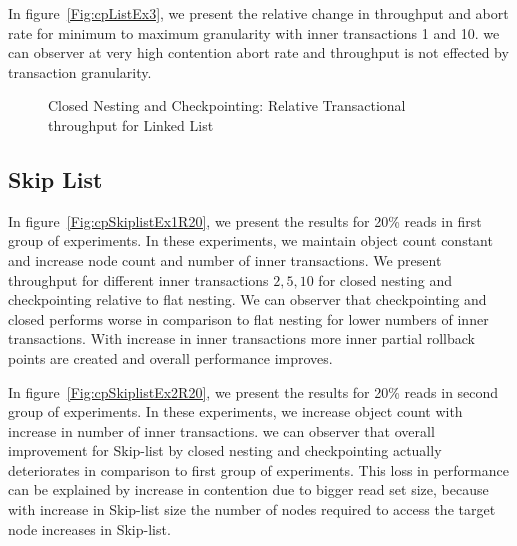 \documentclass[12pt,english]{report}
\begin{document}
In figure~\ref{Fig:cpListEx3}, we present the relative change in throughput and abort rate for minimum to maximum granularity with inner transactions 1 and 10. we can observer at very high contention abort rate and throughput is not effected by transaction granularity.

\begin{figure}[H]
\centering
{}
\end{figure}
\begin{figure}[H]
\centering
{}
\end{figure}
\begin{figure}[H]
\centering
{}
\caption{Closed Nesting and Checkpointing: Relative Transactional throughput for Linked List}
\label{Fig:cpList}
\end{figure}

\subsection{Skip List}
In figure~\ref{Fig:cpSkiplistEx1R20}, we present the results for 20\% reads in first group of experiments. In these experiments, we maintain object count constant and increase node count and number of inner transactions. We present throughput for different inner transactions ${2, 5, 10}$ for closed nesting and checkpointing relative to flat nesting. We can observer that checkpointing and closed performs worse in comparison to flat nesting for lower numbers of inner transactions. With increase in inner transactions more inner partial rollback points are created and overall performance improves.

In figure~\ref{Fig:cpSkiplistEx2R20}, we present the results for 20\% reads in second group of experiments. In these experiments, we increase object count with increase in number of inner transactions. we can observer that overall improvement for Skip-list by closed nesting and checkpointing actually deteriorates in comparison to first group of experiments. This loss in performance can be explained by increase in contention due to bigger read set size, because with increase in Skip-list size the number of nodes required to access the target node increases in Skip-list.
\end{document}

